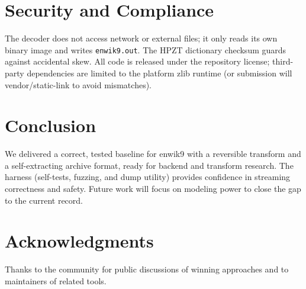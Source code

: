 \documentclass[11pt]{article}
\begin{document}
\section{Security and Compliance}
The decoder does not access network or external files; it only reads its own binary image and writes \texttt{enwik9.out}. The HPZT dictionary checksum guards against accidental skew. All code is released under the repository license; third-party dependencies are limited to the platform zlib runtime (or submission will vendor/static-link to avoid mismatches).

\section{Conclusion}
We delivered a correct, tested baseline for enwik9 with a reversible transform and a self-extracting archive format, ready for backend and transform research. The harness (self-tests, fuzzing, and dump utility) provides confidence in streaming correctness and safety. Future work will focus on modeling power to close the gap to the current record.

\section*{Acknowledgments}
Thanks to the community for public discussions of winning approaches and to maintainers of related tools.
\end{document}

